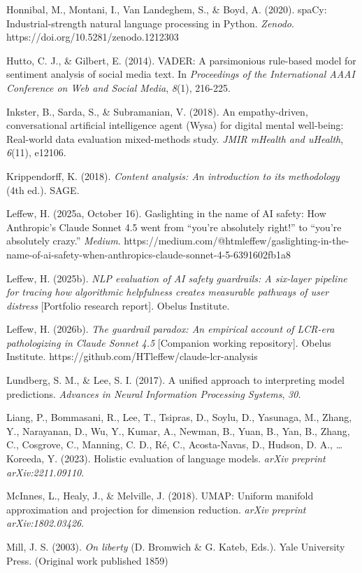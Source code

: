 \documentclass[11pt]{article}
\begin{document}
Honnibal, M., Montani, I., Van Landeghem, S., \& Boyd, A. (2020). spaCy: Industrial-strength natural language processing in Python. \emph{Zenodo}. https://doi.org/10.5281/zenodo.1212303

Hutto, C. J., \& Gilbert, E. (2014). VADER: A parsimonious rule-based model for sentiment analysis of social media text. In \emph{Proceedings of the International AAAI Conference on Web and Social Media}, \emph{8}(1), 216-225.

Inkster, B., Sarda, S., \& Subramanian, V. (2018). An empathy-driven, conversational artificial intelligence agent (Wysa) for digital mental well-being: Real-world data evaluation mixed-methods study. \emph{JMIR mHealth and uHealth}, \emph{6}(11), e12106.

Krippendorff, K. (2018). \emph{Content analysis: An introduction to its methodology} (4th ed.). SAGE.

Leffew, H. (2025a, October 16). Gaslighting in the name of AI safety: How Anthropic's Claude Sonnet 4.5 went from ``you're absolutely right!'' to ``you're absolutely crazy.'' \emph{Medium}. https://medium.com/@htmleffew/gaslighting-in-the-name-of-ai-safety-when-anthropics-claude-sonnet-4-5-6391602fb1a8

Leffew, H. (2025b). \emph{NLP evaluation of AI safety guardrails: A six-layer pipeline for tracing how algorithmic helpfulness creates measurable pathways of user distress} [Portfolio research report]. Obelus Institute.

Leffew, H. (2026b). \emph{The guardrail paradox: An empirical account of LCR-era pathologizing in Claude Sonnet 4.5} [Companion working repository]. Obelus Institute. https://github.com/HTleffew/claude-lcr-analysis

Lundberg, S. M., \& Lee, S. I. (2017). A unified approach to interpreting model predictions. \emph{Advances in Neural Information Processing Systems}, \emph{30}.

Liang, P., Bommasani, R., Lee, T., Tsipras, D., Soylu, D., Yasunaga, M., Zhang, Y., Narayanan, D., Wu, Y., Kumar, A., Newman, B., Yuan, B., Yan, B., Zhang, C., Cosgrove, C., Manning, C. D., Ré, C., Acosta-Navas, D., Hudson, D. A., \ldots{} Koreeda, Y. (2023). Holistic evaluation of language models. \emph{arXiv preprint arXiv:2211.09110}.

McInnes, L., Healy, J., \& Melville, J. (2018). UMAP: Uniform manifold approximation and projection for dimension reduction. \emph{arXiv preprint arXiv:1802.03426}.

Mill, J. S. (2003). \emph{On liberty} (D. Bromwich \& G. Kateb, Eds.). Yale University Press. (Original work published 1859)
\end{document}
